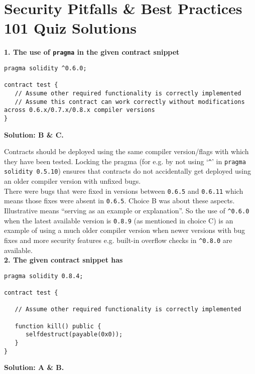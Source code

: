 \section{Security Pitfalls \& Best Practices 101 Quiz Solutions}

\textbf{1. The use of \texttt{pragma} in the given contract snippet}\label{sec:exam4_q1}

\begin{lstlisting}[language=Solidity, style=solStyle]
pragma solidity ^0.6.0;

contract test {
   // Assume other required functionality is correctly implemented
   // Assume this contract can work correctly without modifications across 0.6.x/0.7.x/0.8.x compiler versions
}
\end{lstlisting}

\textbf{Solution: B \& C.}

Contracts should be deployed using the same compiler version/flags with which they have been tested.
Locking the pragma (for e.g. by not using `\verb|^|' in \verb|pragma solidity 0.5.10|) ensures that contracts do not accidentally get deployed using an older compiler version with unfixed bugs.\\

There were bugs that were fixed in versions between \verb|0.6.5| and \verb|0.6.11| which means those fixes were absent in \verb|0.6.5|.
Choice B was about these aspects.\\

Illustrative means ``serving as an example or explanation''.
So the use of \verb|^0.6.0| when the latest available version is \verb|0.8.9| (as mentioned in choice C) is an example of using a much older compiler version when newer versions with bug fixes and more security features e.g. built-in overflow checks in \verb|^0.8.0| are available.\\

\textbf{2. The given contract snippet has}\label{sec:exam4_q2}

\begin{lstlisting}[language=Solidity, style=solStyle]
pragma solidity 0.8.4;

contract test {

   // Assume other required functionality is correctly implemented

   function kill() public {
      selfdestruct(payable(0x0));
   }
}
\end{lstlisting}

\textbf{Solution: A \& B.}

